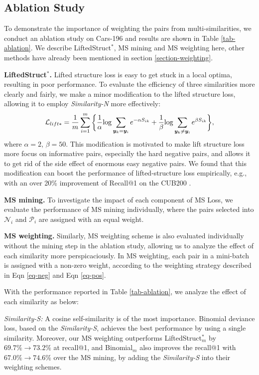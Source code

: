 \documentclass[10pt,twocolumn,letterpaper]{article}
\def\vy{{\bm{y}}}
\begin{document}
\subsection{Ablation Study}
\label{ablation}

To  demonstrate the importance of weighting the pairs from multi-similarities, we conduct an ablation study on Cars-196 and results are shown in Table \ref{tab-ablation}.
We describe LiftedStruct$^*$, MS mining and MS weighting here, other methods have already been mentioned in section \ref{section-weighting}.  

{\bf{LiftedStruct$^*$.} }   Lifted structure loss is easy to get stuck in a local optima, resulting in poor performance. To evaluate the efficiency of three similarities more clearly and fairly, we make a minor modification to the lifted structure loss, allowing it to employ {\it Similarity-N} more effectively:
\begin{equation}
\small
\label{eq-lift*}
\mathcal{L}_{lift*} = \frac{1}{m}\sum_{i=1}^m  \bigg\{\frac{1}{\alpha}  { \log  \sum_{\vy_k = \vy_i } e^{-\alpha S_{ik}}}  + 
 \frac{1}{\beta}  { \log \sum_{\vy_k \neq \vy_i}
	e^{\beta S_{ik}}} \bigg\}, 
\end{equation} 
where $\alpha=2$, $\beta=50$. This modification is motivated to make lift structure loss more focus on informative pairs, especially the hard negative pairs, and allows it to get rid of the side effect of enormous easy negative pairs. We found that this modification can boost the performance of lifted-structure loss empirically, e.g., with an over 20\%  improvement of Recall@1 on the CUB200 .

{\bf MS mining.} To investigate the impact of each component of MS Loss, we evaluate the performance of MS mining individually, where the pairs selected into $\mathcal{N}_i$ and $\mathcal{P}_i$ are assigned with an equal weight.

{\bf MS weighting.} Similarly, MS weighting scheme is also evaluated individually without the mining step in the ablation study, allowing us to analyze the effect of each similarity more perspicaciously. In MS weighting, each pair in a mini-batch is assigned with a non-zero weight, according to the weighting strategy described in Eqn \ref{eq-neg} and Eqn \ref{eq-pos}.
 
With the performance reported in Table \ref{tab-ablation}, we analyze the effect of each similarity as below:

{\it Similarity-S:} A cosine self-similarity is of the most importance. Binomial deviance loss, based on the {\it Similarity-S}, achieves the best performance by using a single similarity. Moreover, our MS weighting outperforms LiftedStruct$_m^*$ by $69.7\% \rightarrow 73.2\%$ at recall@1, and  Binomial$_m$ also improves the recall@1 with $67.0\% \rightarrow74.6\%$ over the MS mining,  by adding the {\it Similarity-S} into their weighting schemes. 
\end{document}
